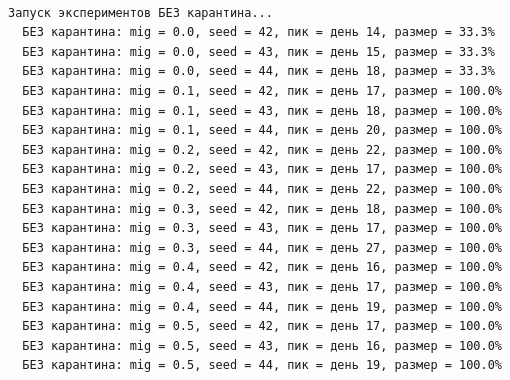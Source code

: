 \documentclass[
  12pt,
  a4paper,
  DIV=11,
  numbers=noendperiod]{scrreprt}
\begin{document}
\begin{verbatim}

Запуск экспериментов БЕЗ карантина...
  БЕЗ карантина: mig = 0.0, seed = 42, пик = день 14, размер = 33.3%
  БЕЗ карантина: mig = 0.0, seed = 43, пик = день 15, размер = 33.3%
  БЕЗ карантина: mig = 0.0, seed = 44, пик = день 18, размер = 33.3%
  БЕЗ карантина: mig = 0.1, seed = 42, пик = день 17, размер = 100.0%
  БЕЗ карантина: mig = 0.1, seed = 43, пик = день 18, размер = 100.0%
  БЕЗ карантина: mig = 0.1, seed = 44, пик = день 20, размер = 100.0%
  БЕЗ карантина: mig = 0.2, seed = 42, пик = день 22, размер = 100.0%
  БЕЗ карантина: mig = 0.2, seed = 43, пик = день 17, размер = 100.0%
  БЕЗ карантина: mig = 0.2, seed = 44, пик = день 22, размер = 100.0%
  БЕЗ карантина: mig = 0.3, seed = 42, пик = день 18, размер = 100.0%
  БЕЗ карантина: mig = 0.3, seed = 43, пик = день 17, размер = 100.0%
  БЕЗ карантина: mig = 0.3, seed = 44, пик = день 27, размер = 100.0%
  БЕЗ карантина: mig = 0.4, seed = 42, пик = день 16, размер = 100.0%
  БЕЗ карантина: mig = 0.4, seed = 43, пик = день 17, размер = 100.0%
  БЕЗ карантина: mig = 0.4, seed = 44, пик = день 19, размер = 100.0%
  БЕЗ карантина: mig = 0.5, seed = 42, пик = день 17, размер = 100.0%
  БЕЗ карантина: mig = 0.5, seed = 43, пик = день 16, размер = 100.0%
  БЕЗ карантина: mig = 0.5, seed = 44, пик = день 19, размер = 100.0%


\end{verbatim}
\end{document}
